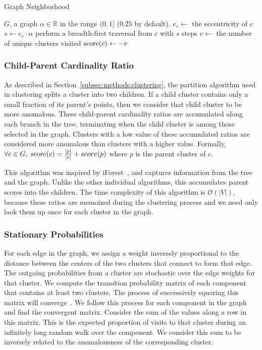 \begin{algorithm}[h]
    \caption{Graph Neighborhood}
    \label{alg:graph-neighborhood-size}
\begin{algorithmic}[1]
    \REQUIRE $G$, a graph
    \REQUIRE $\alpha \in \mathbb{R}$ in the range $(0,1]$ ($0.25$ by default).
        \STATE $e_c \gets$ the eccentricity of $c$
        \STATE $s \gets e_c \cdot \alpha$  %
        \STATE perform a breadth-first traversal from $c$ with $s$ steps
        \STATE $v \gets$ the number of unique clusters visited
        \STATE $\operatorname{score}(c) \gets -v$
    \ENDFOR
\end{algorithmic}
\end{algorithm}


\subsubsection{Child-Parent Cardinality Ratio}
\label{subsubsec:methods:individual-algorithms:child-parent-cardinality-ratio}
As described in Section~\ref{subsec:methods:clustering}, the partition algorithm used in clustering splits a cluster into two children.
If a child cluster contains only a small fraction of its parent's points, then we consider that child cluster to be more anomalous.
These child-parent cardinality ratios are accumulated along each branch in the tree, terminating when the child cluster is among those selected in the graph.
Clusters with a low value of these accumulated ratios are considered more anomalous than clusters with a higher value.
Formally, $\forall c \in G, \ \score(c) = \frac{|p|}{|c|} + score(p)$ where $p$ is the parent cluster of $c$.

This algorithm was inspired by iForest~\cite{tony2008iforest}, and captures information from the tree and the graph.
Unlike the other individual algorithms, this accumulates parent scores into the children.
The time complexity of this algorithm is $\mathcal{O}(|V|)$, because these ratios are memoized during the clustering process and we need only look them up once for each cluster in the graph.


\subsubsection{Stationary Probabilities}
\label{subsubsec:methods:individual-algorithms:stationary-probabilities}
For each edge in the graph, we assign a weight inversely proportional to the distance between the centers of the two clusters that connect to form that edge.
The outgoing probabilities from a cluster are stochastic over the edge weights for that cluster.
We compute the transition probability matrix of each component that contains at least two clusters.
The process of successively squaring this matrix will converge~\cite{levin2017markov}.
We follow this process for each component in the graph and find the convergent matrix.
Consider the sum of the values along a row in this matrix.
This is the expected proportion of visits to that cluster during an infinitely long random walk over the component.
We consider this sum to be inversely related to the anomalousness of the corresponding cluster.

